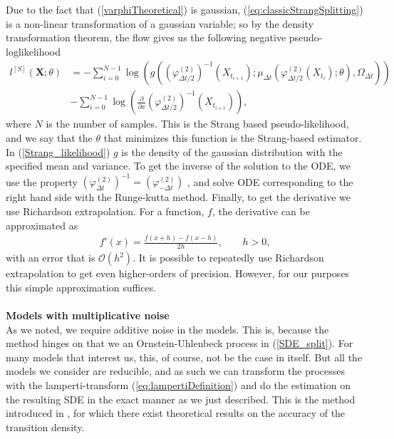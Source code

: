 Due to the fact that (\ref{varphiTheoretical}) is gaussian, (\ref{eq:classicStrangSplitting}) is a non-linear transformation of a gaussian variable; so by the density transformation theorem, the flow gives us the following negative pseudo-loglikelihood 
\begin{align}
    l^{[S]}(\mathbf{X}; \theta) &= -\sum_{i = 0}^{N - 1}\log\left(g\left(\left(\varphi_{\Delta t / 2}^{(2)}\right)^{-1}\left(X_{t_{i+1}}\right); \mu_{\Delta t}\left(\varphi_{\Delta t/2}^{(2)}\left(X_{t_{i}}\right); \theta \right), \Omega_{\Delta t} \right) \right) \nonumber \\
    &- \sum_{i = 0}^{N - 1}\log\left(\frac{\partial}{\partial x}\left(\varphi_{\Delta t / 2}^{(2)}\right)^{-1}\left(X_{t_{i + 1}}\right) \right), \label{Strang_likelihood}
\end{align}
where $N$ is the number of samples. This is the Strang based pseudo-likelihood, and we say that the $\theta$ that minimizes this function is the Strang-based estimator. In (\ref{Strang_likelihood}) $g$ is the density of the gaussian distribution with the specified mean and variance. To get the inverse of the solution to the ODE, we use the property $\left(\varphi_{\Delta t}^{(2)}\right)^{-1} = \left(\varphi_{-\Delta t}^{(2)}\right)$ \cite[Remark below equation (9)]{SplittingSchemes}, and solve ODE corresponding to the right hand side with the Runge-kutta method. Finally, to get the derivative we use Richardson extrapolation. For a function, $f$, the derivative can be approximated as
\begin{align}
    f'(x) = \frac{f(x + h) - f(x - h)}{2h}, \qquad h > 0,
\end{align}
with an error that is $\mathcal{O}(h^2)$. It is possible to repeatedly use Richardson extrapolation to get even higher-orders of precision. However, for our purposes this simple approximation suffices.
\\\\
\textbf{Models with multiplicative noise}\\
As we noted, we require additive noise in the models. This is, because the method hinges on that we an Ornstein-Uhlenbeck process in (\ref{SDE_split}). For many models that interest us, this, of course, not be the case in itself. But all the models we consider are reducible, and as such we can transform the processes with the lamperti-transform (\ref{eq:lampertiDefinition}) and do the estimation on the resulting SDE in the exact manner as we just described. This is the method introduced in \cite{SplittingSchemes}, for which there exist theoretical results on the accuracy of the transition density.\\
